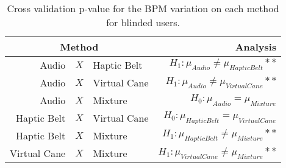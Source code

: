 
\begin{table}[!htb]
\centering
\caption{Cross validation p-value for the BPM variation on each method for blinded users.}
\label{tab:lsdbloc_bpm_var_sight}
\begin{tabular}{rclr}
\toprule
      \multicolumn{3}{c}{Method} &                                       Analysis \\
\midrule
       Audio & $X$ & Haptic Belt &    $H_1 : \mu_{Audio} \ne \mu_{Haptic Belt}**$ \\
      Audio & $X$ & Virtual Cane &   $H_1 : \mu_{Audio} \ne \mu_{Virtual Cane}**$ \\
           Audio & $X$ & Mixture &            $H_0 : \mu_{Audio} = \mu_{Mixture}$ \\
Haptic Belt & $X$ & Virtual Cane & $H_0 : \mu_{Haptic Belt} = \mu_{Virtual Cane}$ \\
     Haptic Belt & $X$ & Mixture &  $H_1 : \mu_{Haptic Belt} \ne \mu_{Mixture}**$ \\
    Virtual Cane & $X$ & Mixture & $H_1 : \mu_{Virtual Cane} \ne \mu_{Mixture}**$ \\
\bottomrule
\end{tabular}
\end{table}

